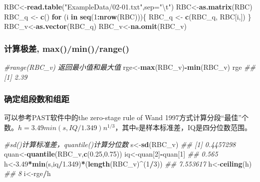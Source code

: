 \documentclass[
]{article}
\newenvironment{Shaded}{\begin{snugshade}}{\end{snugshade}}
\newcommand{\CharTok}[1]{\textcolor[rgb]{0.31,0.60,0.02}{#1}}
\newcommand{\CommentTok}[1]{\textcolor[rgb]{0.56,0.35,0.01}{\textit{#1}}}
\newcommand{\ControlFlowTok}[1]{\textcolor[rgb]{0.13,0.29,0.53}{\textbf{#1}}}
\newcommand{\DataTypeTok}[1]{\textcolor[rgb]{0.13,0.29,0.53}{#1}}
\newcommand{\DecValTok}[1]{\textcolor[rgb]{0.00,0.00,0.81}{#1}}
\newcommand{\FloatTok}[1]{\textcolor[rgb]{0.00,0.00,0.81}{#1}}
\newcommand{\KeywordTok}[1]{\textcolor[rgb]{0.13,0.29,0.53}{\textbf{#1}}}
\newcommand{\NormalTok}[1]{#1}
\newcommand{\OperatorTok}[1]{\textcolor[rgb]{0.81,0.36,0.00}{\textbf{#1}}}
\newcommand{\StringTok}[1]{\textcolor[rgb]{0.31,0.60,0.02}{#1}}
\begin{document}
\begin{Shaded}
\begin{Highlighting}[]
\NormalTok{RBC<-}\KeywordTok{read.table}\NormalTok{(}\StringTok{"ExampleData/02-01.txt"}\NormalTok{,}\DataTypeTok{sep=}\StringTok{"}\CharTok{\textbackslash{}t}\StringTok{"}\NormalTok{)}
\NormalTok{RBC<-}\KeywordTok{as.matrix}\NormalTok{(RBC)}
\NormalTok{RBC_q <-}\StringTok{ }\KeywordTok{c}\NormalTok{()}
\ControlFlowTok{for}\NormalTok{ (i }\ControlFlowTok{in} \KeywordTok{seq}\NormalTok{(}\DecValTok{1}\OperatorTok{:}\KeywordTok{nrow}\NormalTok{(RBC)))\{}
\NormalTok{  RBC_q <-}\StringTok{ }\KeywordTok{c}\NormalTok{(RBC_q, RBC[i,])}
\NormalTok{\}}
\NormalTok{RBC_v<-}\KeywordTok{as.vector}\NormalTok{(RBC_q)}
\NormalTok{RBC_v<-}\KeywordTok{na.omit}\NormalTok{(RBC_v)}
\end{Highlighting}
\end{Shaded}

\hypertarget{ux8ba1ux7b97ux6781ux5dee-maxminrange}{%
\subsubsection{计算极差, max()/min()/range()}\label{ux8ba1ux7b97ux6781ux5dee-maxminrange}}

\begin{Shaded}
\begin{Highlighting}[]
\CommentTok{#range(RBC_v)  返回最小值和最大值}
\NormalTok{rge<-}\KeywordTok{max}\NormalTok{(RBC_v)}\OperatorTok{-}\KeywordTok{min}\NormalTok{(RBC_v)}
\NormalTok{rge}
\CommentTok{## [1] 2.39}
\end{Highlighting}
\end{Shaded}

\hypertarget{ux786eux5b9aux7ec4ux6bb5ux6570ux548cux7ec4ux8ddd}{%
\subsubsection{确定组段数和组距}\label{ux786eux5b9aux7ec4ux6bb5ux6570ux548cux7ec4ux8ddd}}

可以参考PAST软件中的the zero-stage rule of Wand 1997方式计算分段``最佳''个数。\(h=3.49min(s,IQ/1.349)n^{1/3}\)，其中s是样本标准差，IQ是四分位数范围。

\begin{Shaded}
\begin{Highlighting}[]
\CommentTok{#sd()计算标准差，quantile()计算分位数}
\NormalTok{s<-}\KeywordTok{sd}\NormalTok{(RBC_v)}
\CommentTok{## [1] 0.4457298}
\NormalTok{quan<-}\KeywordTok{quantile}\NormalTok{(RBC_v,}\KeywordTok{c}\NormalTok{(}\FloatTok{0.25}\NormalTok{,}\FloatTok{0.75}\NormalTok{))}
\NormalTok{iq<-quan[}\DecValTok{2}\NormalTok{]}\OperatorTok{-}\NormalTok{quan[}\DecValTok{1}\NormalTok{]}
\CommentTok{## 0.565}
\NormalTok{h<-}\FloatTok{3.49}\OperatorTok{*}\KeywordTok{min}\NormalTok{(s,iq}\OperatorTok{/}\FloatTok{1.349}\NormalTok{)}\OperatorTok{*}\NormalTok{(}\KeywordTok{length}\NormalTok{(RBC_v)}\OperatorTok{^}\NormalTok{(}\DecValTok{1}\OperatorTok{/}\DecValTok{3}\NormalTok{))}
\CommentTok{## 7.553617}
\NormalTok{h<-}\KeywordTok{ceiling}\NormalTok{(h)}
\CommentTok{## 8}
\NormalTok{i<-rge}\OperatorTok{/}\NormalTok{h}
\end{Highlighting}
\end{Shaded}
\end{document}
